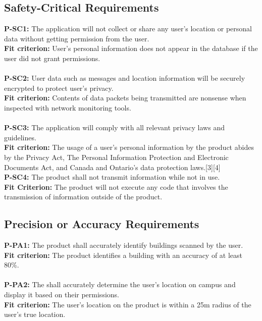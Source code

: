 \documentclass[12pt]{article}
\begin{document}
\subsection{Safety-Critical Requirements}
  \textbf{P-SC1:} The application will not collect or share any user’s location or personal data without getting permission from the user.\\
  \textbf{Fit criterion:} User’s personal information does not appear in the database if the user did not grant permissions.\\\\
  \textbf{P-SC2:} User data such as messages and location information will be securely encrypted to protect user’s privacy.\\
  \textbf{Fit criterion:} Contents of data packets being transmitted are nonsense when inspected with network monitoring tools.\\\\
  \textbf{P-SC3:} The application will comply with all relevant privacy laws and guidelines.\\
  \textbf{Fit criterion:} The usage of a user’s personal information by the product abides by the Privacy Act, The Personal Information Protection and Electronic Documents Act, and Canada and Ontario’s data protection laws.[3][4]\\
  \textbf{P-SC4:} The product shall not transmit information while not in use.\\
  \textbf{Fit Criterion:} The product will not execute any code that involves the transmission of information outside of the product.\\
\subsection{Precision or Accuracy Requirements}
  \textbf{P-PA1:} The product shall accurately identify buildings scanned by the user.\\
  \textbf{Fit criterion:} The product identifies a building with an accuracy of at least 80\%.\\\\
  \textbf{P-PA2:} The shall accurately determine the user’s location on campus and display it based on their permissions.\\
  \textbf{Fit criterion:} The user’s location on the product is within a 25m radius of the user’s true location.\\
\end{document}
